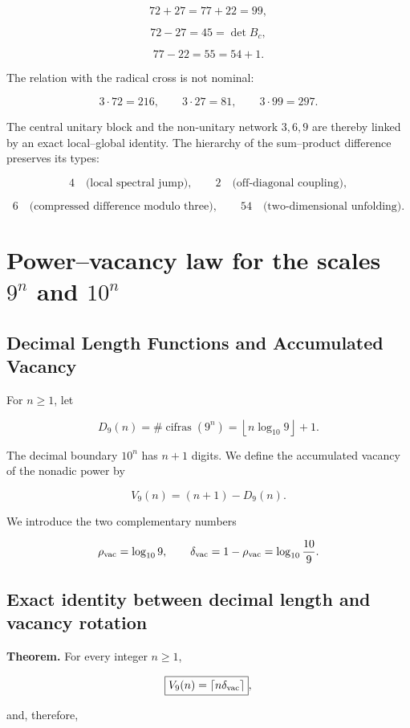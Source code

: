 \[
72+27=77+22=99,
\]

\[
72-27=45=\det B_c,
\]

\[
77-22=55=54+1.
\]

The relation with the radical cross is not nominal:

\[
3\cdot72=216,
\qquad
3\cdot27=81,
\qquad
3\cdot99=297.
\]

The central unitary block and the non-unitary network \(3,6,9\) are thereby linked by an exact local--global identity. The hierarchy of the sum--product difference preserves its types:

\[
4\quad\text{(local spectral jump)},\qquad
2\quad\text{(off-diagonal coupling)},
\]

\[
6\quad\text{(compressed difference modulo three)},\qquad
54\quad\text{(two-dimensional unfolding)}.
\]


\section{Power--vacancy law for the scales \texorpdfstring{\(9^n\)}{9 to the power n} and \texorpdfstring{\(10^n\)}{10 to the power n}}

\subsection{Decimal Length Functions and Accumulated Vacancy}

For \(n\ge1\), let

\[
D_9(n)=\#\operatorname{cifras}(9^n)
=\left\lfloor n\log_{10}9\right\rfloor+1.
\]

The decimal boundary \(10^n\) has \(n+1\) digits. We define the accumulated vacancy of the nonadic power by

\[
V_9(n)=(n+1)-D_9(n).
\]

We introduce the two complementary numbers

\[
\rho_{\rm vac}=\log_{10}9,
\qquad
\delta_{\rm vac}=1-\rho_{\rm vac}
=\log_{10}\frac{10}{9}.
\]

\subsection{Exact identity between decimal length and vacancy rotation}

\textbf{Theorem.} For every integer \(n\ge1\),

\[
\boxed{V_9(n)=\left\lceil n\delta_{\rm vac}\right\rceil},
\]

and, therefore,

